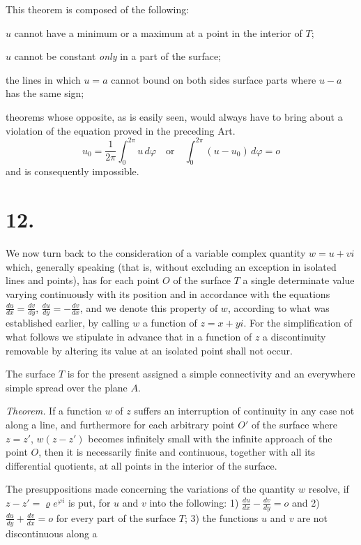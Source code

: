\documentclass{article}
\begin{document}
This theorem is composed of the following:

$u$ cannot have a minimum or a maximum at a point in the interior of $T$;

$u$ cannot be constant \emph{only} in a part of the surface;

the lines in which $u = a$ cannot bound on both sides surface parts where $u - a$ has the same sign;

theorems whose opposite, as is easily seen, would always have to bring about a violation of the equation proved in the preceding Art.
\[
u_0 = \frac{1}{2\pi}\int_0^{2\pi} u\,d\varphi \quad \text{or} \quad \int_0^{2\pi} (u - u_0)\,d\varphi = o
\]
and is consequently impossible.

\section*{12.}

We now turn back to the consideration of a variable complex quantity $w = u + vi$ which, generally speaking (that is, without excluding an exception in isolated lines and points), has for each point $O$ of the surface $T$ a single determinate value varying continuously with its position and in accordance with the equations $\frac{du}{dx} = \frac{dv}{dy}$, $\frac{du}{dy} = -\frac{dv}{dx}$, and we denote this property of $w$, according to what was established earlier, by calling $w$ a function of $z = x + yi$. For the simplification of what follows we stipulate in advance that in a function of $z$ a discontinuity removable by altering its value at an isolated point shall not occur.

The surface $T$ is for the present assigned a simple connectivity and an everywhere simple spread over the plane $A$.

\emph{Theorem.} If a function $w$ of $z$ suffers an interruption of continuity in any case not along a line, and furthermore for each arbitrary point $O'$ of the surface where $z = z'$, $w(z - z')$ becomes infinitely small with the infinite approach of the point $O$, then it is necessarily finite and continuous, together with all its differential quotients, at all points in the interior of the surface.

The presuppositions made concerning the variations of the quantity $w$ resolve, if $z - z' = \varrho e^{\varphi i}$ is put, for $u$ and $v$ into the following: 1) $\frac{du}{dx} - \frac{dv}{dy} = o$ and 2) $\frac{du}{dy} + \frac{dv}{dx} = o$ for every part of the surface $T$; 3) the functions $u$ and $v$ are not discontinuous along a
\end{document}
